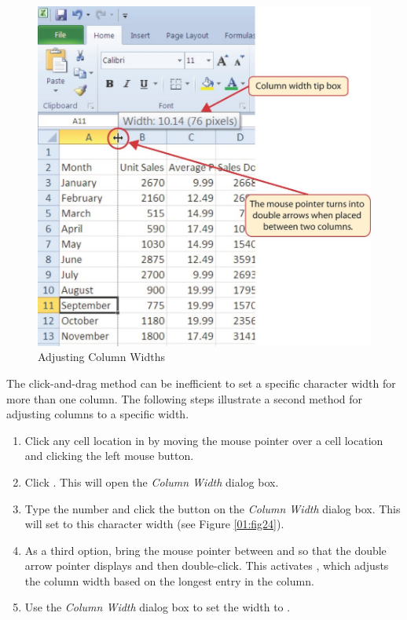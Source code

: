 \begin{figure}[H]
	\centering
	\includegraphics[width=\maxwidth{.95\linewidth}]{gfx/ch01_fig23}
	\caption{Adjusting Column Widths}
	\label{01:fig23}
\end{figure}

The click-and-drag method can be inefficient to set a specific character width for more than one column. The following steps illustrate a second method for adjusting columns to a specific width.

\begin{enumerate}
	\item Click any cell location in  by moving the mouse pointer over a cell location and clicking the left mouse button. 
	\item Click . This will open the \textit{Column Width} dialog box.
	\item Type the number  and click the  button on the \textit{Column Width} dialog box. This will set  to this character width (see Figure \ref{01:fig24}).
	\item As a third option, bring the mouse pointer between  and  so that the double arrow pointer displays and then double-click. This activates , which adjusts the column width based on the longest entry in the column.
	\item Use the \textit{Column Width} dialog box to set the width to .
\end{enumerate}


